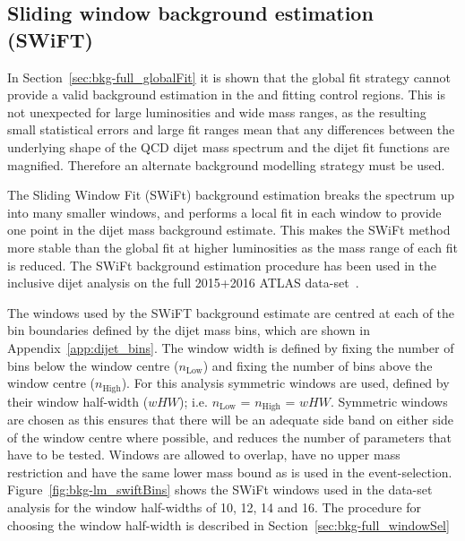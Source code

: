 
\newpage
\subsection{Sliding window background estimation (SWiFT)}\label{sec:bkg-full_swift}

In Section~\ref{sec:bkg-full_globalFit} it is shown that the global fit strategy cannot provide a
valid background estimation in the \hm{} and \lm{} fitting control regions.
This is not unexpected for large luminosities and wide mass ranges,
as the resulting small statistical errors and large fit ranges mean that any
differences between the underlying shape of the QCD dijet mass spectrum
and the dijet fit functions are magnified.
Therefore an alternate background modelling strategy must be used.

The Sliding Window Fit (SWiFt) background estimation breaks the spectrum up into many smaller windows,
and performs a local fit in each window to provide one point in the dijet mass background estimate.
This makes the SWiFt method more stable than the global fit at higher luminosities as the mass range of each fit is reduced.
The SWiFt background estimation procedure has been used in the inclusive dijet analysis on the full 2015+2016 ATLAS data-set~\cite{dijet-mori17_paper}.

The windows used by the SWiFT background estimate are centred at each of the
bin boundaries defined by the dijet mass bins, which are shown in Appendix~\ref{app:dijet_bins}.
The window width is defined by fixing the number of bins below the window centre ($n_{\text{Low}}$)
and fixing the number of bins above the window centre ($n_{\text{High}}$).
For this analysis symmetric windows are used, defined by their window half-width ($wHW$); i.e. $n_{\text{Low}}$ = $n_{\text{High}}$ = $wHW$.
Symmetric windows are chosen as this ensures that there will be an adequate side band on either side of the window centre where possible,
and reduces the number of parameters that have to be tested.
Windows are allowed to overlap, have no upper mass restriction and have the same lower mass bound as is used in the event-selection.
Figure~\ref{fig:bkg-lm_swiftBins} shows the SWiFt windows used in the \lm{} data-set analysis for the window half-widths of 10, 12, 14 and 16.
The procedure for choosing the window half-width is described in Section~\ref{sec:bkg-full_windowSel}

